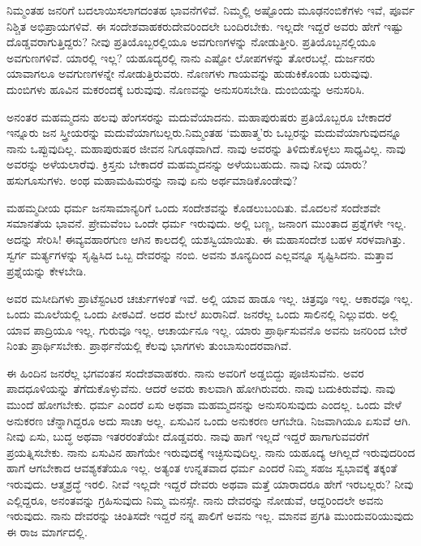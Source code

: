 ನಿಮ್ಮಂತಹ ಜನರಿಗೆ ಬದಲಾಯಿಸಲಾಗದಂತಹ ಭಾವನೆಗಳಿವೆ. ನಿಮ್ಮಲ್ಲಿ ಅಷ್ಟೊಂದು ಮೂಢನಂಬಿಕೆಗಳು ಇವೆ, ಪೂರ್ವ ನಿಶ್ಚಿತ ಅಭಿಪ್ರಾಯಗಳಿವೆ. ಈ ಸಂದೇಶವಾಹಕರು\break ದೇವರಿಂದಲೇ ಬಂದಿರಬೇಕು. ಇಲ್ಲದೇ ಇದ್ದರೆ ಅವರು ಹೇಗೆ ಇಷ್ಟು ದೊಡ್ಡವರಾಗುತ್ತಿದ್ದರು? ನೀವು ಪ್ರತಿಯೊಬ್ಬರಲ್ಲಿಯೂ ಅವಗುಣಗಳನ್ನು ನೋಡುತ್ತೀರಿ. ಪ್ರತಿಯೊಬ್ಬನಲ್ಲಿಯೂ ಅವಗುಣಗಳಿವೆ. ಯಾರಲ್ಲಿ ಇಲ್ಲ? ಯಹೂದ್ಯರಲ್ಲಿ ನಾನು ಎಷ್ಟೋ ಲೋಪಗಳನ್ನು ತೋರಬಲ್ಲೆ. ದುರ್ಜನರು ಯಾವಾಗಲೂ ಅವಗುಣಗಳನ್ನೇ ನೋಡುತ್ತಿರುವರು. ನೊಣಗಳು ಗಾಯವನ್ನು ಹುಡುಕಿಕೊಂಡು ಬರುವುವು. ದುಂಬಿಗಳು ಹೂವಿನ ಮಕರಂದಕ್ಕೆ ಬರುವುವು. ನೊಣವನ್ನು ಅನುಸರಿಸಬೇಡಿ. ದುಂಬಿಯನ್ನು ಅನುಸರಿಸಿ.

ಅನಂತರ ಮಹಮ್ಮದನು ಹಲವು ಹೆಂಗಸರನ್ನು ಮದುವೆಯಾದನು. ಮಹಾಪುರು\-ಷರು ಪ್ರತಿಯೊಬ್ಬರೂ ಬೇಕಾದರೆ ಇನ್ನೂರು ಜನ ಸ್ತ್ರೀಯರನ್ನು ಮದುವೆಯಾಗಬಲ್ಲರು.\break ನಿಮ್ಮಂತಹ ‘ಮಹಾತ್ಮ’ರು ಒಬ್ಬರನ್ನು ಮದುವೆಯಾಗುವುದನ್ನೂ ನಾನು ಒಪ್ಪುವುದಿಲ್ಲ. ಮಹಾಪುರುಷರ ಜೀವನ ನಿಗೂಢವಾಗಿದೆ. ನಾವು ಅವರನ್ನು ತಿಳಿದುಕೊಳ್ಳಲು ಸಾಧ್ಯವಿಲ್ಲ. ನಾವು ಅವರನ್ನು ಅಳೆಯಲಾರೆವು. ಕ್ರಿಸ್ತನು ಬೇಕಾದರೆ ಮಹಮ್ಮದನನ್ನು ಅಳೆಯಬಹುದು. ನಾವು ನೀವು ಯಾರು? ಹಸುಗೂಸುಗಳು. ಅಂಥ ಮಹಾಮಹಿಮರನ್ನು ನಾವು ಏನು ಅರ್ಥಮಾಡಿಕೊಂಡೇವು?

ಮಹಮ್ಮದೀಯ ಧರ್ಮ ಜನಸಾಮಾನ್ಯರಿಗೆ ಒಂದು ಸಂದೇಶವನ್ನು ಕೊಡಲು\break ಬಂದಿತು. ಮೊದಲನೆ ಸಂದೇಶವೇ ಸಮಾನತೆಯ ಭಾವನೆ. ಪ್ರೇಮವೆಂಬ ಒಂದೇ ಧರ್ಮ ಇರುವುದು. ಅಲ್ಲಿ ಬಣ್ಣ, ಜನಾಂಗ ಮುಂತಾದ ಪ್ರಶ್ನೆಗಳೇ ಇಲ್ಲ. ಅದನ್ನು ಸೇರಿಸಿ! ಈ\break ವ್ಯವಹಾರಗುಣ ಆಗಿನ ಕಾಲದಲ್ಲಿ ಯಶಸ್ವಿಯಾಯಿತು. ಈ ಮಹಾಸಂದೇಶ ಬಹಳ ಸರಳ\-ವಾಗಿತ್ತು. ಸ್ವರ್ಗ ಮರ್ತ್ಯಗಳನ್ನು ಸೃಷ್ಟಿಸಿದ ಒಬ್ಬ ದೇವರನ್ನು ನಂಬಿ. ಅವನು ಶೂನ್ಯದಿಂದ ಎಲ್ಲವನ್ನೂ ಸೃಷ್ಟಿಸಿದನು. ಮತ್ತಾವ ಪ್ರಶ್ನೆಯನ್ನು ಕೇಳಬೇಡಿ.

ಅವರ ಮಸೀದಿಗಳು ಪ್ರಾಟೆಸ್ಟಂಟರ ಚರ್ಚುಗಳಂತೆ ಇವೆ. ಅಲ್ಲಿ ಯಾವ ಹಾಡೂ ಇಲ್ಲ. ಚಿತ್ರವೂ ಇಲ್ಲ. ಆಕಾರವೂ ಇಲ್ಲ. ಒಂದು ಮೂಲೆಯಲ್ಲಿ ಒಂದು ಪೀಠವಿದೆ. ಅದರ ಮೇಲೆ ಖುರಾನಿದೆ. ಜನರೆಲ್ಲ ಒಂದು ಸಾಲಿನಲ್ಲಿ ನಿಲ್ಲುವರು. ಅಲ್ಲಿ ಯಾವ ಪಾದ್ರಿಯೂ ಇಲ್ಲ. ಗುರುವೂ ಇಲ್ಲ. ಆಚಾರ್ಯನೂ ಇಲ್ಲ. ಯಾರು ಪ್ರಾರ್ಥಿಸುವನೊ ಅವನು ಜನರಿಂದ ಬೇರೆ ನಿಂತು ಪ್ರಾರ್ಥಿಸಬೇಕು. ಪ್ರಾರ್ಥನೆಯಲ್ಲಿ ಕೆಲವು ಭಾಗಗಳು ತುಂಬಾ\break ಸುಂದರವಾಗಿವೆ.

ಈ ಹಿಂದಿನ ಜನರೆಲ್ಲ ಭಗವಂತನ ಸಂದೇಶವಾಹಕರು. ನಾನು ಅವರಿಗೆ ಅಡ್ಡಬಿದ್ದು ಪೂಜಿಸುವೆನು. ಅವರ ಪಾದಧೂಳಿಯನ್ನು ತೆಗೆದುಕೊಳ್ಳುವೆನು. ಆದರೆ ಅವರು ಕಾಲವಾಗಿ ಹೋಗಿರುವರು. ನಾವು ಬದುಕಿರುವೆವು. ನಾವು ಮುಂದೆ ಹೋಗಬೇಕು. ಧರ್ಮ ಎಂದರೆ ಏಸು ಅಥವಾ ಮಹಮ್ಮದನನ್ನು ಅನುಸರಿಸುವುದು ಎಂದಲ್ಲ. ಒಂದು ವೇಳೆ ಅನುಕರಣ ಚೆನ್ನಾಗಿದ್ದರೂ ಅದು ಸಾಚಾ ಅಲ್ಲ. ಏಸುವಿನ ಒಂದು ಅನುಕರಣ ಆಗಬೇಡಿ. ನಿಜವಾಗಿಯೂ ಏಸುವೆ ಆಗಿ. ನೀವು ಏಸು, ಬುದ್ಧ ಅಥವಾ ಇತರರಂತೆಯೇ ದೊಡ್ಡವರು. ನಾವು ಹಾಗೆ ಇಲ್ಲದೆ ಇದ್ದರೆ ಹಾಗಾಗುವವರೆಗೆ ಪ್ರಯತ್ನಿಸಬೇಕು. ನಾನು ಏಸುವಿನ ಹಾಗೆಯೇ ಇರುವುದಕ್ಕೆ ಇಚ್ಛಿಸುವುದಿಲ್ಲ. ನಾನು ಯಹೂದ್ಯ ಆಗಿಲ್ಲದೆ ಇರುವುದರಿಂದ ಹಾಗೆ ಆಗಬೇಕಾದ ಆವಶ್ಯಕತೆಯೂ ಇಲ್ಲ. ಅತ್ಯಂತ ಉನ್ನತವಾದ ಧರ್ಮ ಎಂದರೆ ನಿಮ್ಮ ಸಹಜ ಸ್ವಭಾವಕ್ಕೆ ತಕ್ಕಂತೆ ಇರುವುದು. ಆತ್ಮಶ್ರದ್ಧೆ ಇರಲಿ. ನೀವೆ ಇಲ್ಲದೇ ಇದ್ದರೆ ದೇವರು ಅಥವಾ ಮತ್ತೆ ಯಾರಾದರೂ ಹೇಗೆ ಇರಬಲ್ಲರು? ನೀವು ಎಲ್ಲಿದ್ದರೂ, ಅನಂತವನ್ನು ಗ್ರಹಿಸುವುದು ನಿಮ್ಮ ಮನಸ್ಸೇ. ನಾನು ದೇವರನ್ನು ನೋಡುವೆ, ಆದ್ದರಿಂದಲೇ ಅವನು ಇರುವುದು. ನಾನು ದೇವರನ್ನು ಚಿಂತಿಸದೇ ಇದ್ದರೆ ನನ್ನ ಪಾಲಿಗೆ ಅವನು ಇಲ್ಲ. ಮಾನವ ಪ್ರಗತಿ ಮುಂದುವರಿಯುವುದು ಈ ರಾಜ ಮಾರ್ಗದಲ್ಲಿ.

